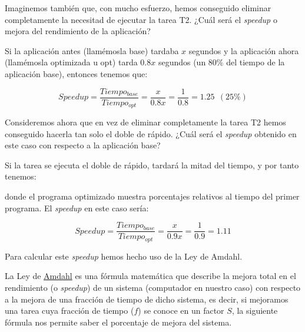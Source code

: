 \documentclass[12pt,onecolumn]{memoir}
\begin{document}
Imaginemos también que, con mucho esfuerzo, hemos conseguido eliminar
completamente la necesitad de ejecutar la tarea
T2. ¿Cuál será el \emph{speedup} o mejora del rendimiento de la aplicación?

Si la aplicación antes (llamémosla base) tardaba $x$ segundos y la
aplicación ahora (llamémosla optimizada u opt) tarda 0.8$x$
segundos (un 80\% del tiempo de la aplicación base), entonces tenemos que:

\[ Speedup = \frac{Tiempo_{base}}{Tiempo_{opt}} = \frac{x}{0.8x} =
\frac{1}{0.8} = 1.25 ~ ~ (25\%) \]

Consideremos ahora que en vez de eliminar completamente la tarea T2
hemos conseguido hacerla tan solo el doble de rápido. ¿Cuál será el
\emph{speedup} obtenido en este caso con respecto a la aplicación base?

Si la tarea se ejecuta el doble de
rápido, tardará la mitad del tiempo, y por tanto tenemos:

\begin{center}
\end{center}

donde el programa optimizado muestra porcentajes relativos al tiempo
del primer programa. El \emph{speedup} en este caso sería:

\[ Speedup = \frac{Tiempo_{base}}{Tiempo_{opt}} = \frac{x}{0.9x} = \frac{1}{0.9} = 1.11 \]

Para calcular este \emph{speedup} hemos hecho uso de la Ley de Amdahl.

La Ley de \href{https://es.wikipedia.org/wiki/Gene_Amdahl}{Amdahl} es una 
fórmula matemática que describe la mejora total en el rendimiento (o \emph{speedup}) de un 
sistema (computador en nuestro caso) con respecto a la mejora de una
fracción de tiempo
de dicho sistema, es decir, si mejoramos una tarea cuya fracción de
tiempo ($f$) se conoce en un factor $S$, la siguiente fórmula nos permite saber el porcentaje de
mejora del sistema.
\end{document}
